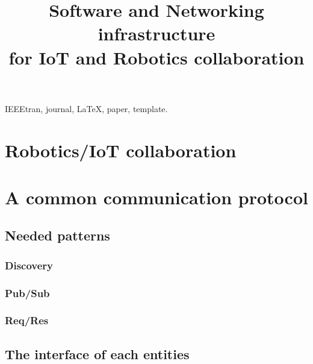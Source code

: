 \documentclass[conference]{IEEEtran}
\begin{document}
\title{Software and Networking infrastructure \\for IoT and Robotics collaboration}

\author{
\and
{}
\and
{}
}

\maketitle

\begin{abstract}
\end{abstract}

\begin{IEEEkeywords}
IEEEtran, journal, \LaTeX, paper, template.
\end{IEEEkeywords}

\IEEEpeerreviewmaketitle

\section{Robotics/IoT collaboration}

\section{A common communication protocol}

\subsection{Needed patterns}
\subsubsection{Discovery}
\subsubsection{Pub/Sub}
\subsubsection{Req/Res}

\subsection{The interface of each entities}
\end{document}
